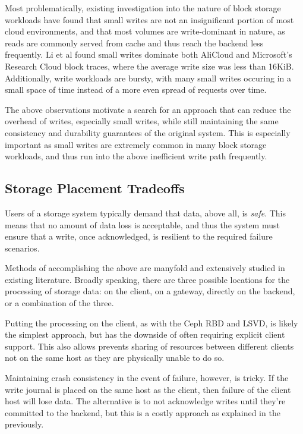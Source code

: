 Most problematically, existing investigation into the nature of block storage
workloads have found that small writes are not an insignificant portion of most
cloud environments, and that most volumes are write-dominant in nature, as reads
are commonly served from cache and thus reach the backend less frequently.  Li
et al \cite{li2020depth} found small writes dominate both AliCloud and
Microsoft's Research Cloud block traces, where the average write size was less
than 16KiB.  Additionally, write workloads are bursty, with many small writes
occuring in a small space of time instead of a more even spread of requests over
time.

The above observations motivate a search for an approach that can reduce the
overhead of writes, especially small writes, while still maintaining the same
consistency and durability guarantees of the original system. This is especially
important as small writes are extremely common in many block storage workloads,
and thus run into the above inefficient write path frequently.


\subsection{Storage Placement Tradeoffs}

Users of a storage system typically demand that data, above all, is
\textit{safe}.  This means that no amount of data loss is acceptable, and thus
the system must ensure that a write, once acknowledged, is resilient to the
required failure scenarios.

Methods of accomplishing the above are manyfold and extensively studied in
existing literature. Broadly speaking, there are three possible locations for
the processing of storage data: on the client, on a gateway, directly on the
backend, or a combination of the three.

Putting the processing on the client, as with the Ceph RBD and LSVD, is likely
the simplest approach, but has the downside of often requiring explicit client
support. This also allows prevents sharing of resources between different
clients not on the same host as they are physically unable to do so.

Maintaining crash consistency in the event of failure, however, is tricky. If
the write journal is placed on the same host as the client, then failure of the
client host will lose data. The alternative is to not acknowledge writes until
they're committed to the backend, but this is a costly approach as explained in
the previously.

